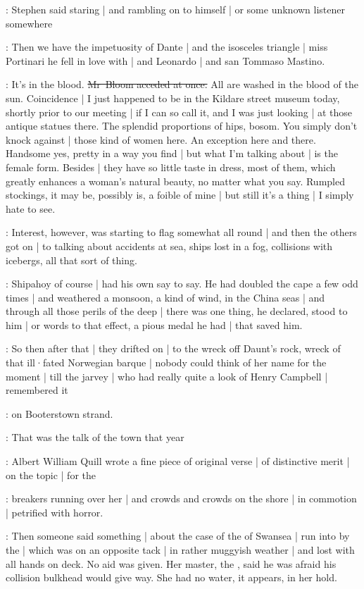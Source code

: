 :
Stephen said staring |
and rambling on to himself |
or some unknown listener somewhere

\Stephen:
Then we have the impetuosity of Dante |
and the isosceles triangle |
miss Portinari he fell in love with |
and Leonardo |
and san Tommaso Mastino.

\Bloom:
It's in the blood.
\sout{Mr~Bloom acceded at once.}
All are washed in the blood of the sun.
Coincidence |
I just happened to be
in the Kildare street museum today,
shortly prior to our meeting |
if I can so call it,
and I was just looking |
at those antique statues there.
The splendid proportions of hips,
bosom.
You simply don't knock against |
those kind of women here.
An exception here and there.
Handsome yes,
pretty in a way you find |
but what I'm talking about |
is the female form.
Besides |
they have so little taste in dress,
most of them,
which greatly enhances a woman's natural beauty,
no matter what you say.
Rumpled stockings,
it may be,
possibly is,
a foible of mine |
but still it's a thing |
I simply hate to see.

:
Interest,
however,
was starting to flag somewhat all round |
and then the others got on |
to talking about accidents at sea,
ships lost in a fog,
collisions with icebergs,
all that sort of thing.

:
Shipahoy of course |
had his own say to say.
He had doubled the cape a few odd times |
and weathered a monsoon,
a kind of wind,
in the China seas |
and through all those perils of the deep |
there was one thing,
he declared,
stood to him |
or words to that effect,
a pious medal he had |
that saved him.

:
So then after that |
they drifted on |
to the wreck off Daunt's rock,
wreck of that ill·fated Norwegian barque |
nobody could think of her name for the moment |
till the jarvey |
who had really quite a look of Henry Campbell |
remembered it

\Campbell:
 on Booterstown strand.

:
That was the talk of the town that year%

:
Albert William Quill wrote a fine piece of original verse |
of distinctive merit |
on the topic |
for the 

:
breakers running over her |
and crowds and crowds on the shore |
in commotion |
petrified with horror.

:
Then someone said something |
about the case of the  of Swansea |
run into by the  |
which was on an opposite tack |
in rather muggyish weather |
and lost with all hands on deck.
No aid was given.
Her master,
the ,
said he was afraid his collision bulkhead would give way.
She had no water,
it appears,
in her hold.

